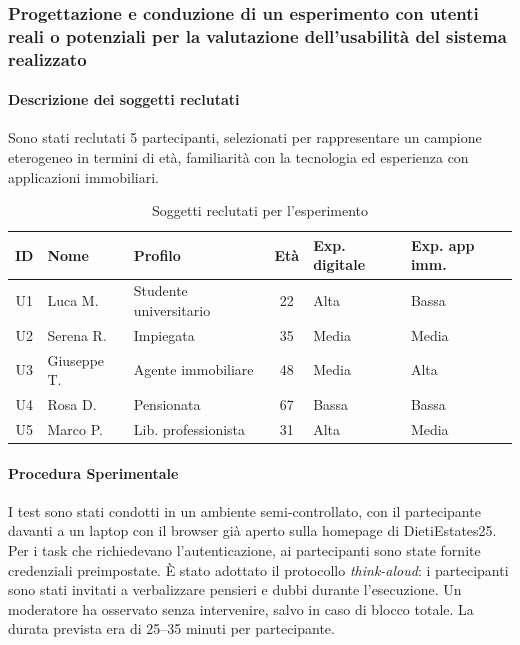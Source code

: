 \documentclass{article}
\begin{document}
\subsubsection{Progettazione e conduzione di un esperimento con utenti reali o potenziali per la
valutazione dell'usabilità del sistema realizzato}

\paragraph{Descrizione dei soggetti reclutati}
Sono stati reclutati 5 partecipanti, selezionati per rappresentare un campione 
eterogeneo in termini di età, familiarità con la tecnologia ed esperienza con 
applicazioni immobiliari.

\begin{table}[H]
\centering
\renewcommand{\arraystretch}{1.5}
\begin{tabular}{|c|l|l|c|l|l|}
\hline
\rowcolor[HTML]{010066}
{\color{white}\textbf{ID}} & {\color{white}\textbf{Nome}} & {\color{white}\textbf{Profilo}} & {\color{white}\textbf{Età}} & {\color{white}\textbf{Exp. digitale}} & {\color{white}\textbf{Exp. app imm.}} \\
\hline
U1 & Luca M.     & Studente universitario & 22 & Alta  & Bassa \\ \hline
U2 & Serena R.   & Impiegata              & 35 & Media & Media \\ \hline
U3 & Giuseppe T. & Agente immobiliare     & 48 & Media & Alta  \\ \hline
U4 & Rosa D.     & Pensionata             & 67 & Bassa & Bassa \\ \hline
U5 & Marco P.    & Lib. professionista    & 31 & Alta  & Media \\ \hline
\end{tabular}
\caption{Soggetti reclutati per l'esperimento}
\end{table}

\paragraph{Procedura Sperimentale}
I test sono stati condotti in un ambiente semi-controllato, con il partecipante 
davanti a un laptop con il browser già aperto sulla homepage di DietiEstates25. 
Per i task che richiedevano l'autenticazione, ai partecipanti sono state fornite 
credenziali preimpostate. È stato adottato il protocollo \textit{think-aloud}: 
i partecipanti sono stati invitati a verbalizzare pensieri e dubbi durante 
l'esecuzione. Un moderatore ha osservato senza intervenire, salvo in caso 
di blocco totale. La durata prevista era di 25--35 minuti per partecipante.
\end{document}

